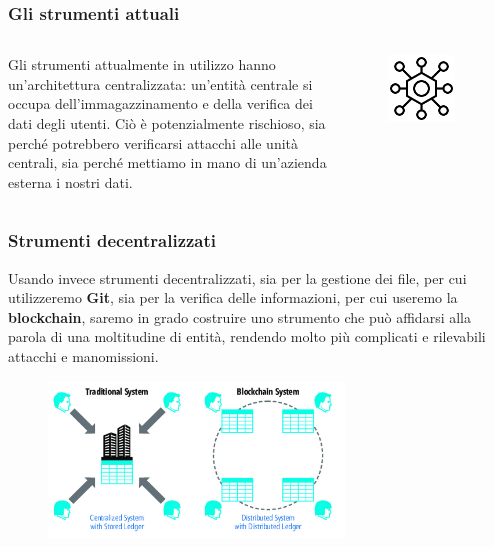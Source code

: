 \documentclass{beamer}
\begin{document}
\begin{frame}
	\frametitle{Gli strumenti attuali}
	\begin{columns}
		Gli strumenti attualmente in utilizzo hanno un'architettura centralizzata:
		un'entità centrale si occupa dell'immagazzinamento e della verifica dei dati
		degli utenti. Ciò è potenzialmente rischioso, sia perché potrebbero verificarsi
		attacchi alle unità centrali,
		sia perché mettiamo in mano di un'azienda esterna i nostri dati.
		\begin{figure}
			\includegraphics[width=0.80\textwidth]{cent.png}
		\end{figure}
	\end{columns}
\end{frame}

\begin{frame}
	\frametitle{Strumenti decentralizzati}
		Usando invece strumenti decentralizzati, sia per la gestione dei file,
		per cui utilizzeremo \textbf{Git}, sia per la verifica delle informazioni,
		per cui useremo la \textbf{blockchain}, saremo in grado costruire uno strumento
		che può affidarsi alla parola di una moltitudine di entità, rendendo molto
		più complicati e rilevabili attacchi e manomissioni.
	\medskip
	\begin{figure}
		\includegraphics[width=0.70\textwidth]{dece.jpg}
	\end{figure}
\end{frame}
\end{document}

